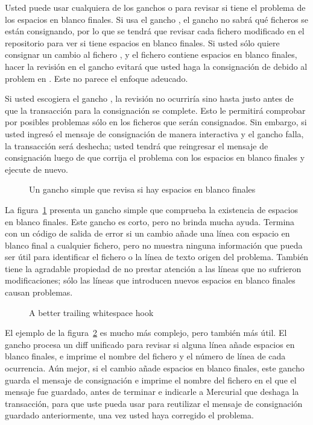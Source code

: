Usted puede usar cualquiera de los ganchos  o
 para revisar si tiene el problema de los espacios
en blanco finales. Si usa el gancho , el gancho no
sabrá qué ficheros se están consignando, por lo que se tendrá que
revisar cada fichero modificado en el repositorio para ver si tiene
espacios en blanco finales. Si usted sólo quiere consignar un cambio
al fichero , y el fichero  contiene
espacios en blanco finales, hacer la revisión en el gancho
 evitará que usted haga la consignación de
 debido al problem en .  Este no parece el
enfoque adeucado.

Si usted escogiera el gancho , la revisión no
ocurriría sino hasta justo antes de que la transacción para la
consignación se complete. Esto le permitirá comprobar por posibles
problemas sólo en los ficheros que serán consignados. Sin embargo, si
usted ingresó el mensaje de consignación de manera interactiva y el
gancho falla, la transacción será deshecha; usted tendrá que
reingresar el mensaje de consignación luego de que corrija el problema
con los espacios en blanco finales y ejecute  de nuevo.

\begin{figure}[ht]
  \caption{Un gancho simple que revisa si hay espacios en blanco
  finales}
  \label{ex:hook:ws.simple}
\end{figure}

La figura~\ref{ex:hook:ws.simple} presenta un gancho
 simple que comprueba la existencia de espacios en
blanco finales. Este gancho es corto, pero no brinda mucha ayuda.
Termina con un código de salida de error si un cambio añade una línea
con espacio en blanco final a cualquier fichero, pero no muestra
ninguna información que pueda ser útil para identificar el fichero o
la línea de texto origen del problema. También tiene la agradable
propiedad de no prestar atención a las líneas que no sufrieron
modificaciones; sólo las líneas que introducen nuevos espacios en
blanco finales causan problemas.

\begin{figure}[ht]
  \caption{A better trailing whitespace hook}
  \label{ex:hook:ws.better}
\end{figure}

El ejemplo de la figura~\ref{ex:hook:ws.better} es mucho más complejo,
pero también más útil. El gancho procesa un diff unificado para
revisar si alguna línea añade espacios en blanco finales, e imprime el
nombre del fichero y el número de línea de cada ocurrencia. Aún mejor,
si el cambio añade espacios en blanco finales, este gancho guarda el
mensaje de consignación e imprime el nombre del fichero en el que el
mensaje fue guardado, antes de terminar e indicarle a Mercurial que
deshaga la transacción, para que uste pueda usar
 para
reutilizar el mensaje de consignación guardado anteriormente, una vez
usted haya corregido el problema.

